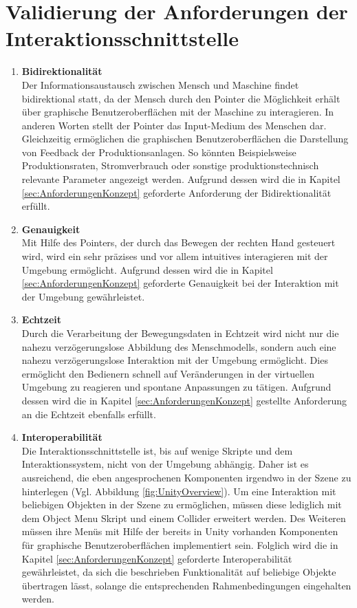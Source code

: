 \section{Validierung der Anforderungen der Interaktionsschnittstelle}\label{sec:ValidInteraktion}

\begin{enumerate}
	\item \textbf{Bidirektionalität} \\
	Der Informationsaustausch zwischen Mensch und Maschine findet bidirektional statt, da der Mensch durch den Pointer die Möglichkeit erhält über graphische Benutzeroberflächen mit der Maschine zu interagieren. In anderen Worten stellt der Pointer das Input-Medium des Menschen dar. Gleichzeitig ermöglichen die graphischen Benutzeroberflächen die Darstellung von Feedback der Produktionsanlagen. So könnten Beispielsweise Produktionsraten, Stromverbrauch oder sonstige produktionstechnisch relevante Parameter angezeigt werden. Aufgrund dessen wird die in Kapitel \ref{sec:AnforderungenKonzept} geforderte Anforderung der Bidirektionalität erfüllt.
	\item \textbf{Genauigkeit} \\
	Mit Hilfe des Pointers, der durch das Bewegen der rechten Hand gesteuert wird, wird ein sehr präzises und vor allem intuitives interagieren mit der Umgebung ermöglicht. Aufgrund dessen wird die in Kapitel \ref{sec:AnforderungenKonzept} geforderte Genauigkeit bei der Interaktion mit der Umgebung gewährleistet.
	\item \textbf{Echtzeit} \\
	Durch die Verarbeitung der Bewegungsdaten in Echtzeit wird nicht nur die nahezu verzögerungslose Abbildung des Menschmodells, sondern auch eine nahezu verzögerungslose Interaktion mit der Umgebung ermöglicht. Dies ermöglicht den Bedienern schnell auf Veränderungen in der virtuellen Umgebung zu reagieren und spontane Anpassungen zu tätigen. Aufgrund dessen wird die in Kapitel \ref{sec:AnforderungenKonzept} gestellte Anforderung an die Echtzeit ebenfalls erfüllt.
	\item \textbf{Interoperabilität} \\
	Die Interaktionsschnittstelle ist, bis auf wenige Skripte und dem Interaktionssystem, nicht von der Umgebung abhängig. Daher ist es ausreichend, die eben angesprochenen Komponenten irgendwo in der Szene zu hinterlegen (Vgl. Abbildung \ref{fig:UnityOverview}). Um eine Interaktion mit beliebigen Objekten in der Szene zu ermöglichen, müssen diese lediglich mit dem Object Menu Skript und einem Collider erweitert werden. Des Weiteren müssen ihre Menüs mit Hilfe der bereits in Unity vorhanden Komponenten für graphische Benutzeroberflächen implementiert sein. Folglich wird die in Kapitel \ref{sec:AnforderungenKonzept} geforderte Interoperabilität gewährleistet, da sich die beschrieben Funktionalität auf beliebige Objekte übertragen lässt, solange die entsprechenden Rahmenbedingungen eingehalten werden.

\end{enumerate}
